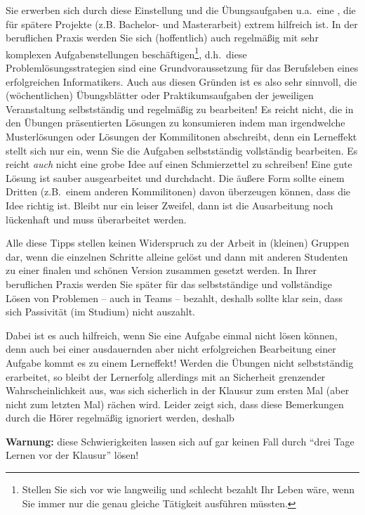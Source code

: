 Sie erwerben sich durch diese Einstellung und die Übungsaufgaben u.a.~eine
, die für spätere Projekte (z.B. Bachelor- und
Masterarbeit) extrem hilfreich ist. In der beruflichen Praxis werden
Sie sich (hoffentlich) auch regelmäßig mit sehr komplexen Aufgabenstellungen
beschäftigen\footnote{Stellen Sie sich vor wie langweilig und schlecht bezahlt Ihr Leben 
wäre, wenn Sie immer nur die genau gleiche Tätigkeit ausführen müssten.}, d.h.~diese 
Problemlösungsstrategien sind eine Grundvoraussetzung für das Berufsleben eines 
erfolgreichen Informatikers. Auch aus diesen Gründen ist es also sehr sinnvoll, die
(wöchentlichen) Übungsblätter oder Praktikumsaufgaben der jeweiligen
Veranstaltung selbstständig und regelmäßig zu bearbeiten! Es reicht
nicht, die in den Übungen präsentierten Lösungen zu konsumieren indem man irgendwelche 
Musterlösungen oder Lösungen der Kommilitonen abschreibt, denn
ein Lerneffekt stellt sich nur ein, wenn Sie die Aufgaben
selbstständig vollständig bearbeiten. Es reicht \emph{auch} nicht eine grobe Idee auf einen 
Schmierzettel zu schreiben! Eine gute Lösung ist sauber ausgearbeitet und durchdacht. Die äußere 
Form sollte einem Dritten (z.B.~einem anderen Kommilitonen) davon überzeugen können, dass die 
Idee richtig ist. Bleibt nur ein leiser Zweifel, dann ist die Ausarbeitung noch lückenhaft und muss 
überarbeitet werden. 

Alle diese Tipps  stellen keinen Widerspruch zu der Arbeit in (kleinen) Gruppen dar, wenn die 
einzelnen Schritte alleine gelöst und dann mit anderen Studenten zu einer finalen und  schönen 
Version zusammen gesetzt werden. In Ihrer beruflichen Praxis werden Sie später für das 
selbstständige und vollständige Lösen von Problemen -- auch in Teams -- bezahlt, deshalb 
sollte  klar sein, dass sich  Passivität (im Studium) nicht auszahlt. 
 
Dabei ist es auch hilfreich, wenn Sie eine Aufgabe einmal nicht lösen können,
denn auch bei einer ausdauernden aber nicht erfolgreichen Bearbeitung
einer Aufgabe kommt es zu einem Lerneffekt! Werden die Übungen nicht
selbstständig erarbeitet, so bleibt der Lernerfolg allerdings mit an Sicherheit grenzender Wahrscheinlichkeit aus, was sich sicherlich in der Klausur zum ersten Mal (aber nicht zum letzten Mal) rächen wird. Leider zeigt sich, dass diese Bemerkungen durch die Hörer regelmäßig ignoriert werden, deshalb

\begin{center}
\large \textbf{Warnung:}  diese Schwierigkeiten lassen sich auf gar keinen Fall durch 
"`drei Tage Lernen vor der Klausur"' lösen!
\end{center}

